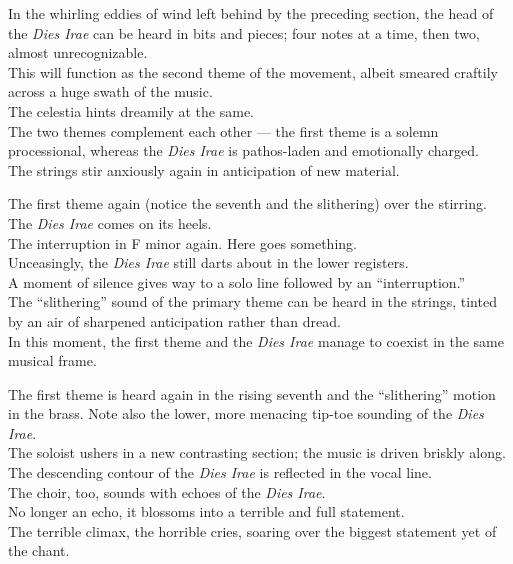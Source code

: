 \documentclass{beamer}
\begin{document}
\begin{frame}
  In the whirling eddies of wind left behind by the preceding section, the head of the \textit{Dies Irae} can be heard in bits and pieces; \pause four notes at a time, \pause then two, almost unrecognizable. 
  \pause \\
  This will function as the second theme of the movement, albeit smeared craftily across a huge swath of the music. 
  \pause \\ 
  The celestia hints dreamily at the same. 
  \pause \\ 
  The two themes complement each other --- the first theme is a solemn processional, whereas the \textit{Dies Irae} is pathos-laden and emotionally charged. 
  \pause \\ 
  The strings stir anxiously again in anticipation of new material. 
\end{frame} 

\begin{frame} 
  The first theme again (notice the seventh and the slithering) over the stirring. \pause The \textit{Dies Irae} comes on its heels. 
  \pause \\ 
  The interruption in F minor again. Here goes something. 
  \pause \\ 
  Unceasingly, the \textit{Dies Irae} still darts about in the lower registers. 
  \pause \\ 
  A moment of silence gives way to a solo line followed by an ``interruption.'' 
  \pause \\ 
  The ``slithering'' sound of the primary theme can be heard in the strings, tinted by an air of sharpened anticipation rather than dread. 
  \pause \\ 
  In this moment, the first theme and the \textit{Dies Irae} manage to coexist in the same musical frame. 
\end{frame} 

\begin{frame}
  The first theme is heard again in the rising seventh and the ``slithering'' motion in the brass. Note also the lower, more menacing tip-toe sounding of the \textit{Dies Irae}. 
  \pause \\ 
  The soloist ushers in a new contrasting section; the music is driven briskly along. 
  \pause \\ 
  The descending contour of the \textit{Dies Irae} is reflected in the vocal line. 
  \pause \\ 
  The choir, too, sounds with echoes of the \textit{Dies Irae}. 
  \pause \\
  No longer an echo, it blossoms into a terrible and full statement. 
  \pause \\ 
  The terrible climax, the horrible cries, soaring over the biggest statement yet of the chant. 
\end{frame} 
\end{document}
